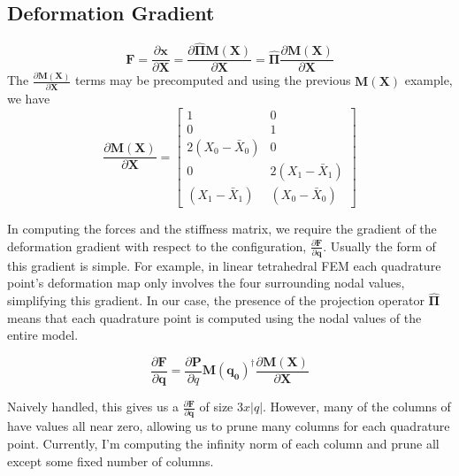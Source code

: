 \documentclass[sigconf]{acmart}
\begin{document}
\subsection{Deformation Gradient}
\begin{equation}
        \mathbf{F} = \frac{\partial \mathbf{x}}{\partial \mathbf{X}}
               = \frac{\partial \hat{\mathbf{\Pi}}\mathbf{M(X)}}{\partial \mathbf{X}}
               = \hat{\mathbf{\Pi}} \frac{\partial \mathbf{M(X)}}{\partial \mathbf{X}} 
\end{equation}
The $\frac{\partial \mathbf{M(X)}}{\partial \mathbf{X}}$ terms may be precomputed and using the previous $\mathbf{M(X)}$ example, we have
\begin{equation}
     \frac{\partial \mathbf{M(X)}}{\partial \mathbf{X}} = \begin{bmatrix}
     1&0 \\ 
     0&1 \\ 
     2(X_0 - \bar{X}_0)&0 \\ 
     0&2(X_1 - \bar{X}_1) \\ 
     (X_1 - \bar{X}_1)&(X_0 - \bar{X}_0) 
    \end{bmatrix}
\end{equation}

In computing the forces and the stiffness matrix, we require the gradient of the deformation gradient with respect to the configuration,  $\frac{\partial \mathbf{F}}{\partial \mathbf{q}}$. Usually the form of this gradient is simple. For example, in linear tetrahedral FEM each quadrature point's deformation map only involves the four surrounding nodal values, simplifying this gradient. In our case, the presence of the projection operator $\hat{\mathbf{\Pi}}$ means that each quadrature point is computed using the nodal values of the entire model. 

\begin{equation}
    \frac{\partial \mathbf{F}}{\partial \mathbf{q}} = \frac{\partial \mathbf{P}}{\partial q}\mathbf{M(q_0)}^\dagger  \frac{\partial \mathbf{M(X)}}{\partial \mathbf{X}} 
\end{equation}


Naively handled, this gives us a $\frac{\partial \mathbf{F}}{\partial \mathbf{q}}$ of size $3 x |q|$. However, many of the columns of have values all near zero, allowing us to prune many columns for each quadrature point. Currently, I'm computing the infinity norm of each column and prune all except some fixed number of columns. \\
\end{document}
